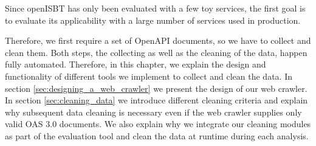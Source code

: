 

Since openISBT has only been evaluated with a few toy services, the first goal is to evaluate its applicability with a large number of services used in production. 

Therefore, we first require a set of OpenAPI documents, so we have to collect and clean them. Both steps, the collecting as well as the cleaning of the data, happen fully automated. Therefore, in this chapter, we explain the design and functionality of different tools we implement to collect and clean the data. In section \ref{sec:designing_a_web_crawler} we present the design of our web crawler. In section \ref{sec:cleaning_data} we introduce different cleaning criteria and explain why subsequent data cleaning is necessary even if the web crawler supplies only valid OAS 3.0 documents.
We also explain why we integrate our cleaning modules as part of the evaluation tool and clean the data at runtime during each analysis. 